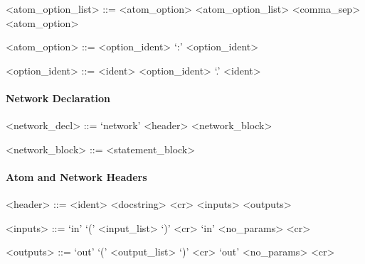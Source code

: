 \vs

\begin{grammar}
  <atom_option_list> ::= <atom_option>
  \alt <atom_option_list> <comma_sep> <atom_option>
\end{grammar}

\vs

\begin{grammar}
  <atom_option> ::= <option_ident> `:' <option_ident>
\end{grammar}

\vs

\begin{grammar}
  <option_ident> ::= <ident>
  \alt <option_ident> `.' <ident>
\end{grammar}


\paragraph{Network Declaration}

\begin{grammar}
  <network_decl> ::= `network' <header> <network_block>
\end{grammar}

\vs

\begin{grammar}
  <network_block> ::= <statement_block>
\end{grammar}


\paragraph{Atom and Network Headers}

\begin{grammar}
  <header> ::= <ident> <docstring> <cr> <inputs> <outputs>
\end{grammar}

\vs

\begin{grammar}
  <inputs> ::= `in' `(' <input_list> `)' <cr>
  \alt `in' <no_params> <cr>
\end{grammar}

\vs

\begin{grammar}
  <outputs> ::= `out' `(' <output_list> `)' <cr>
  \alt `out' <no_params> <cr>
\end{grammar}


